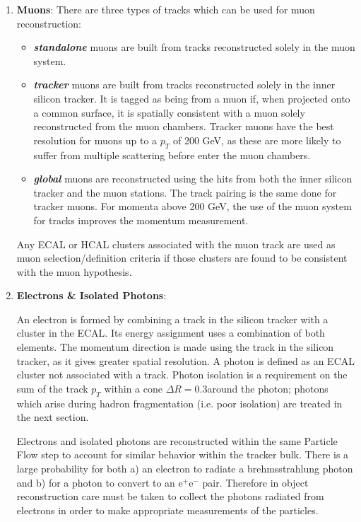 \begin{enumerate}
\item \textbf{Muons}:
There are three types of tracks which can be used for muon reconstruction:
\begin{itemize}
\item
\textit{\textbf{standalone}} muons are built from tracks reconstructed solely in the muon system.
\item
\textit{\textbf{tracker}} muons are built from tracks reconstructed solely in the inner silicon tracker. It is tagged as being from a muon if, when projected onto a common surface, it is spatially consistent with a muon solely reconstructed from the muon chambers. Tracker muons have the best resolution for muons up to a $p_{T}$ of 200 GeV, as these are more likely to suffer from multiple scattering before enter the muon chambers.
\item
\textit{\textbf{global}} muons are reconstructed using the hits from both the inner silicon tracker and the muon stations.  The track pairing is the same done for tracker muons. For momenta above 200 GeV, the use of the muon system for tracks improves the momentum measurement.
\end{itemize}

Any ECAL or HCAL clusters associated with the muon track are used as muon selection/definition criteria if those clusters are found to be consistent with the muon hypothesis.

\item \textbf{Electrons \& Isolated Photons}:

An electron is formed by combining a track in the silicon tracker with a cluster in the ECAL. Its energy assignment uses a combination of both elements. The momentum direction is made using the track in the silicon tracker, as it gives greater spatial resolution.  A photon is defined as an ECAL cluster not associated with a track. Photon isolation is a requirement on the sum of the track $p_{T}$ within a cone $\Delta R = 0.3$around the photon; photons which arise during hadron fragmentation (i.e. poor isolation) are treated in the next section. 

Electrons and isolated photons are reconstructed within the same Particle Flow step to account for similar behavior within the tracker bulk. There is a large probability for both a) an electron to radiate a brehmsstrahlung photon and b) for a photon to convert to an e$^{+}$e$^{-}$ pair. Therefore in object reconstruction care must be taken to collect the photons radiated from electrons in order to make appropriate measurements of the particles.


\end{enumerate}
